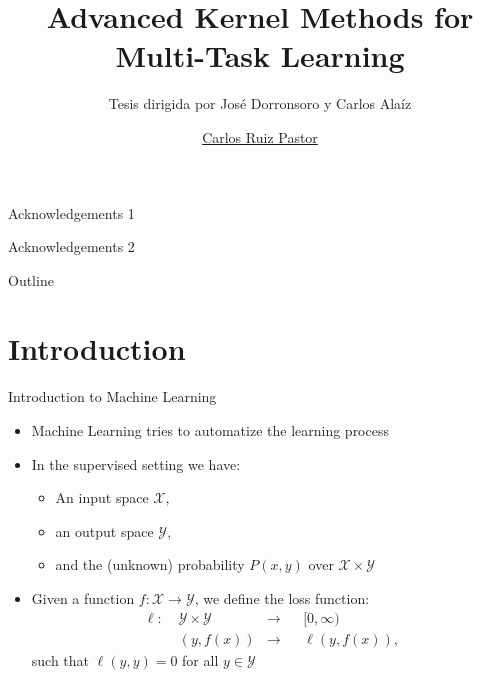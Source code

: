\documentclass{beamer}
\title{Advanced Kernel Methods for
Multi-Task Learning}
\subtitle{Tesis dirigida por José Dorronsoro y Carlos Alaíz}
\author{\href{mailto:carlos.ruizp@uam.es}{Carlos Ruiz Pastor}}
\newcommand{\lossf}{\ell}
\newcommand{\Xspace}{\mathcal{X}}
\newcommand{\Yspace}{\mathcal{Y}}
\begin{document}
\maketitle

\begin{frame}

Acknowledgements 1

\vspace{\baselineskip}

Acknowledgements 2

\end{frame}


\begin{frame}{Outline}{}
      \tableofcontents
\end{frame}

\section{Introduction}

\begin{frame}
      {Introduction to Machine Learning}

      \begin{itemize}
            \item Machine Learning tries to automatize the learning process
            \item In the supervised setting we have:
            \begin{itemize}
                  \item An input space $\Xspace$,
                  \item an output space $\Yspace$,
                  \item and the (unknown) probability $P(x, y)$ over $\Xspace \times \Yspace$
            \end{itemize} 
            \item Given a function $f: \Xspace \to \Yspace$, we define the loss function:
            \begin{equation}
                  \begin{aligned}
              \nonumber
              \lossf:\; &\Yspace \times \Yspace &\to &&[0, \infty) \\
              &(y, f(x)) &\to  && \lossf(y, f(x)) ,
          \end{aligned}
          \end{equation}
          such that $\lossf(y, y) = 0$ for all $y \in \Yspace$
            
      \end{itemize}
      
\end{frame}
\end{document}
